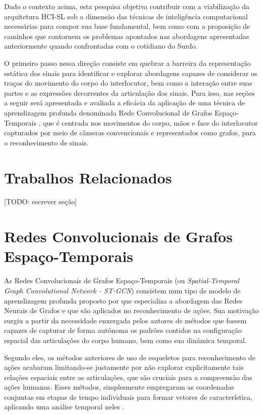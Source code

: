 Dado o contexto acima, esta pesquisa objetiva contribuir com a viabilização da arquitetura HCI-SL sob a dimensão das técnicas de inteligência computacional necessárias para compor sua base fundamental, bem como com a proposição de caminhos que contornem os problemas apontados nas abordagens apresentadas anteriormente quando confrontadas com o cotidiano do Surdo. 

O primeiro passo nessa direção consiste em quebrar a barreira da representação estática dos sinais para identificar e explorar abordagens capazes de considerar os traços do movimento do corpo do interlocutor, bem como a interação entre suas partes e as expressões decorrentes da articulação dos sinais. Para isso, nas seções a seguir será apresentada e avaliada a eficácia da aplicação de uma técnica de aprendizagem profunda denominada Rede Convolucional de Grafos Espaço-Temporais \cite{st-gcn-2018}, que é centrada nos movimentos do corpo, mãos e face do interlocutor capturados por meio de câmeras convencionais e representados como grafos, para o reconhecimento de sinais. 


\section{Trabalhos Relacionados} %

[TODO: escrever seção]


\section{Redes Convolucionais de Grafos Espaço-Temporais} %

As Redes Convolucionais de Grafos Espaço-Temporais (ou \textit{Spatial-Temporal Graph Convolutional Network - ST-GCN}) consistem num tipo de modelo de aprendizagem profunda proposto por \cite{st-gcn-2018} que especializa a abordagem das Redes Neurais de Grafos e que são aplicados no reconhecimento de ações. Sua motivação surgiu a partir da necessidade enxergada pelos autores de métodos que fossem capazes de capturar de forma autônoma os padrões contidos na configuração espacial das articulações do corpo humano, bem como sua dinâmica temporal.

Segundo eles, os métodos anteriores de uso de esqueletos para reconhecimento de ações acabaram limitando-se justamente por não explorar explicitamente tais relações espaciais entre as articulações, que são cruciais para a compreensão das ações humanas. Esses métodos, simplesmente empregaram as coordenadas conjuntas em etapas de tempo individuais para formar vetores de característica, aplicando uma análise temporal neles \cite{st-gcn-2018, wang-2012, fernando-2015}.

